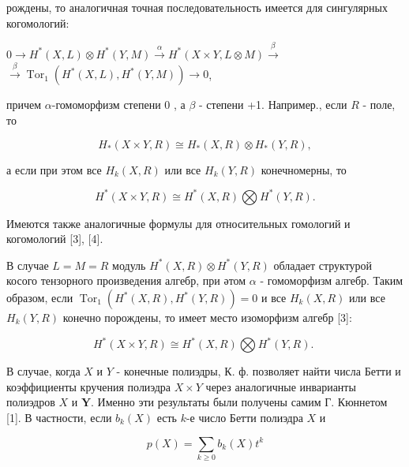\documentclass[10pt]{article}
\begin{document}
рождены, то аналогичная точная последовательность имеется для сингулярных когомологий:



$0 \longrightarrow H^{*}(X, L) \otimes H^{*}(Y, M) \stackrel{\alpha}{\longrightarrow} H^{*}(X \times Y, L \otimes M) \stackrel{\beta}{\longrightarrow}$ $\stackrel{\beta}{\longrightarrow} \operatorname{Tor}_{1}\left(H^{*}(X, L), H^{*}(Y, M)\right) \longrightarrow 0$,



причем $\alpha$-гомоморфизм степени 0 , а $\beta$ - степени +1. Например., если $R$ - поле, то



\[

H_{*}(X \times Y, R) \cong H_{*}(X, R) \otimes H_{*}(Y, R),

\]



а если при этом все $H_{k}(X, R)$ или все $H_{k}(Y, R)$ конечномерны, то



\[

H^{*}(X \times Y, R) \cong H^{*}(X, R) \bigotimes H^{*}(Y, R) .

\]



Имеются также аналогичные формулы для относительных гомологий и когомологий [3], [4].



В случае $L=M=R$ модуль $H^{*}(X, R) \otimes H^{*}(Y, R)$ обладает структурой косого тензорного произведения алгебр, при әтом $\alpha$ - гомоморфизм алгебр. Таким образом, если $\operatorname{Tor}_{1}\left(H^{*}(X, R), H^{*}(Y, R)\right)=0$ и все $H_{k}(X, R)$ или все $H_{k}(Y, R)$ конечно порождены, то имеет место изоморфизм алгебр [3]:



\[

H^{*}(X \times Y, R) \cong H^{*}(X, R) \bigotimes H^{*}(Y, R) \text {. }

\]



В случае, когда $X$ и $Y$ - конечные полиэдры, К. ф. позволяет найти числа Бетти и коэффициенты кручения полиэдра $X \times Y$ через аналогичные инварианты полиэдров $X$ и $\boldsymbol{Y}$. Именно эти результаты были получены самим Г. Кюннетом [1]. В частности, если $b_{k}(X)$ есть $k$-е число Бетти полиэдра $X$ и



\[

p(X)=\sum_{k \geqslant 0} b_{k}(X) t^{k}

\]
\end{document}
